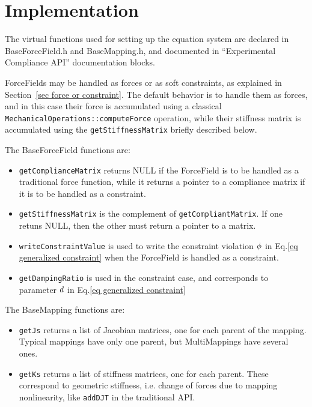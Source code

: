 \section{Implementation}
The virtual functions used for setting up the equation system are declared in BaseForceField.h and BaseMapping.h, and documented in ``Experimental Compliance API'' documentation blocks.

ForceFields may be handled as forces or as soft constraints, as explained in Section~\ref{sec force or constraint}. The default behavior is to handle them as forces, and in this case their force is accumulated using a classical \texttt{MechanicalOperations::computeForce} operation, while their stiffness matrix is accumulated using the \texttt{getStiffnessMatrix} briefly described below.

The BaseForceField functions are:
\begin{itemize}
 \item \texttt{getComplianceMatrix} returns NULL if the ForceField is to be handled as a traditional force function, while it returns a pointer to a compliance matrix if it is to be handled as a constraint.
 \item \texttt{getStiffnessMatrix} is the complement of \texttt{getCompliantMatrix}. If one retuns NULL, then the other must return a pointer to a matrix.
 \item \texttt{writeConstraintValue} is used to write the constraint violation $\phi$ in Eq.\ref{eq generalized constraint} when the ForceField is handled as a constraint.
 \item \texttt{getDampingRatio} is used in the constraint case, and corresponds to parameter $ d$ in Eq.\ref{eq generalized constraint}
\end{itemize}

The BaseMapping functions are:
\begin{itemize}
 \item \texttt{getJs} returns a list of Jacobian matrices, one for each parent of the mapping. Typical mappings have only one parent, but MultiMappings have several ones.
 \item \texttt{getKs} returns a list of stiffness matrices, one for each parent. These correspond to geometric stiffness, i.e. change of forces due to mapping nonlinearity, like \texttt{addDJT} in the traditional API.
\end{itemize}



